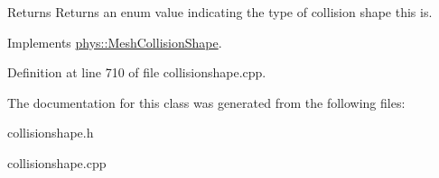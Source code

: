 \begin{DoxyReturn}{Returns}
Returns an enum value indicating the type of collision shape this is. 
\end{DoxyReturn}
 

Implements \hyperlink{classphys_1_1MeshCollisionShape_abc9d3f06df71eadb59ba93eadf6ab82f}{phys::MeshCollisionShape}.



Definition at line 710 of file collisionshape.cpp.



The documentation for this class was generated from the following files:\begin{DoxyCompactItemize}
\item 
collisionshape.h\item 
collisionshape.cpp\end{DoxyCompactItemize}
